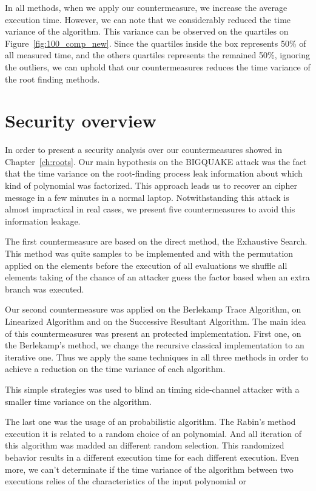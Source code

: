 

In all methods, when we apply our countermeasure, we increase the average execution time. However, we can note that we considerably reduced the time variance of the algorithm. This variance can be observed on the quartiles on Figure~\ref{fig:100_comp_new}. Since the quartiles inside the box represents 50\% of all measured time, and the others quartiles represents the remained 50\%, ignoring the outliers, we can uphold that our countermeasures reduces the time variance of the root finding methods. 

\section{Security overview}
In order to present a security analysis over our countermeasures showed in Chapter~\ref{ch:roots}. Our main hypothesis on the BIGQUAKE attack was the fact that the time variance on the root-finding process leak information about which kind of polynomial was factorized. This approach leads us to recover an cipher message in a few minutes in a normal laptop. Notwithstanding this attack is almost impractical in real cases, we present five countermeasures to avoid this information leakage.

The first countermeasure are based on the direct method, the Exhaustive Search. This method was quite samples to be implemented and with the permutation applied on the elements before the execution of all evaluations we shuffle all elements taking of the chance of an attacker guess the factor based when an extra branch was executed.

Our second countermeasure was applied on the Berlekamp Trace Algorithm, on Linearized Algorithm and on the Successive Resultant Algorithm. The main idea of this countermeasures was present an protected implementation. First one, on the Berlekamp's method, we change the recursive classical implementation to an iterative one. Thus we apply the same techniques in all three methods in order to achieve a reduction on the time variance of each algorithm.

This simple strategies was used to blind an timing side-channel attacker with a smaller time variance on the algorithm. 

The last one was the usage of an probabilistic algorithm. The Rabin's method execution it is related to a random choice of an polynomial. And all iteration of this algorithm was madded an different random selection. This randomized behavior results in a different execution time for each different execution. Even more, we can't determinate if the time variance of the algorithm between two executions relies of the characteristics of the input polynomial or 




